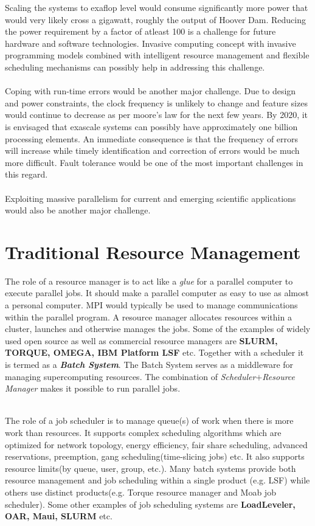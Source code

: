 Scaling the systems to exaflop level would consume significantly more power that would very likely cross a gigawatt, roughly the output of Hoover Dam. Reducing the power requirement by a factor of atleast 100 is a challenge for future hardware and software technologies. Invasive computing concept with invasive programming models combined with intelligent resource management and flexible scheduling mechanisms can possibly help in addressing this challenge.\\ \\
Coping with run-time errors would be another major challenge. Due to design and power constraints, the clock frequency is unlikely to change and feature sizes would continue to decrease as per moore's law for the next few years. By 2020, it is envisaged that exascale systems can possibly have approximately one billion processing elements. An immediate consequence is that the frequency of errors will increase while timely identification and correction of errors would be much more difficult. Fault tolerance would be one of the most important challenges in this regard.\\ \\
Exploiting massive parallelism for current and emerging scientific applications would also be another major challenge.
\section{Traditional Resource Management}
The role of a resource manager is to act like a \textit{glue} for a parallel computer to execute parallel jobs. It should make a parallel computer as easy to use as almost a personal computer. MPI would typically be used to manage communications within the parallel program. A resource manager allocates resources within a cluster, launches and otherwise manages the jobs. Some of the examples of widely used open source as well as commercial resource managers are \textbf{SLURM, TORQUE, OMEGA, IBM Platform LSF} etc. Together with a scheduler it is termed as a \textbf{\textit{Batch System}}. The Batch System serves as a middleware for managing supercomputing resources. The combination of \textit{Scheduler}$+$\textit{Resource Manager} makes it possible to run parallel jobs.\par
\noindent
\\
The role of a job scheduler is to manage queue(s) of work when there is more work than resources. It supports complex scheduling algorithms which are optimized for network topology, energy efficiency, fair share scheduling, advanced reservations, preemption, gang scheduling(time-slicing jobs) etc. It also supports resource limits(by queue, user, group, etc.). Many batch systems provide both resource management and job scheduling within a single product (e.g. LSF) while others use distinct products(e.g. Torque resource manager and Moab job scheduler). Some other examples of job scheduling systems are \textbf{LoadLeveler, OAR, Maui, SLURM} etc.
